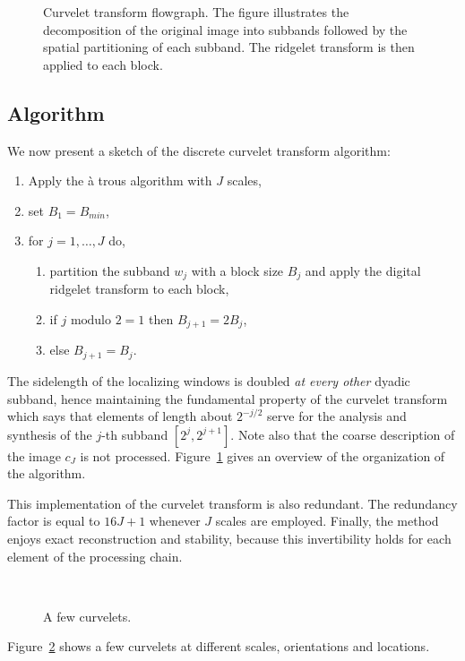 \begin{figure}[htb]
\centerline{
\hbox{}
}
\caption{Curvelet transform flowgraph. The figure illustrates
the decomposition of the original image  into subbands followed by
the spatial partitioning of each subband. The ridgelet transform
is then applied to each block.}
\label{fig_curvelet}
\end{figure}

\subsection{Algorithm}
We now present a sketch of the discrete curvelet transform algorithm:
\begin{enumerate}
\item Apply the \`a trous algorithm with $J$ scales,
\item set $B_1 = B_{min}$,
\item for $j = 1, \ldots, J$ do,
\begin{enumerate}
\item partition the subband $w_j$ with a block size $B_j$ and apply the
digital ridgelet transform to each block,
\item if $j \mbox{ modulo } 2 = 1$ then $B_{j+1} = 2B_{j}$,
\item else $B_{j+1} = B_{j}$.
\end{enumerate}
\end{enumerate}
The sidelength of the localizing windows is doubled {\em at every
      other} dyadic subband, hence maintaining the fundamental property of
the curvelet transform which says that elements of length about
$2^{-j/2}$ serve for the analysis and synthesis of the $j$-th subband
$[2^j, 2^{j+1}]$.  Note also that the coarse description of the image
$c_J$ is not processed. Figure~\ref{fig_curvelet}
gives an overview of the organization of the algorithm.


This implementation of the curvelet transform is also redundant. The
redundancy factor is equal to $16J+1$ whenever $J$ scales are employed.
Finally, the method enjoys exact reconstruction and stability,
because this invertibility holds for each element of the
processing chain.

\begin{figure}[htb]
\centerline{
\hbox{
}}
\caption{A few curvelets.}
\label{fig_ex_curve}
\end{figure}
Figure~\ref{fig_ex_curve} shows a few curvelets at different scales,
orientations and locations.  
 



